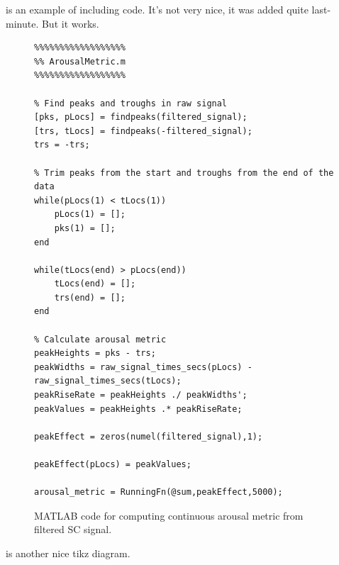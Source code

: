  is an example of including code. It's not very nice, it was added quite last-minute. But it works.

\begin{figure}[h]
	\centering
	
\begin{minipage}{0.8\textwidth}\smaller\begin{verbatim}
%%%%%%%%%%%%%%%%%%
%% ArousalMetric.m
%%%%%%%%%%%%%%%%%%

% Find peaks and troughs in raw signal
[pks, pLocs] = findpeaks(filtered_signal);
[trs, tLocs] = findpeaks(-filtered_signal);
trs = -trs;

% Trim peaks from the start and troughs from the end of the data
while(pLocs(1) < tLocs(1))
    pLocs(1) = [];
    pks(1) = [];
end

while(tLocs(end) > pLocs(end))
    tLocs(end) = [];
    trs(end) = [];
end

% Calculate arousal metric
peakHeights = pks - trs;
peakWidths = raw_signal_times_secs(pLocs) - raw_signal_times_secs(tLocs);
peakRiseRate = peakHeights ./ peakWidths';
peakValues = peakHeights .* peakRiseRate;

peakEffect = zeros(numel(filtered_signal),1);

peakEffect(pLocs) = peakValues;

arousal_metric = RunningFn(@sum,peakEffect,5000);
\end{verbatim}
	\end{minipage}
	\caption{MATLAB code for computing continuous arousal metric from filtered SC signal.}
	\label{fig:matlabGsrMetric}
\end{figure}

 is another nice tikz diagram.


